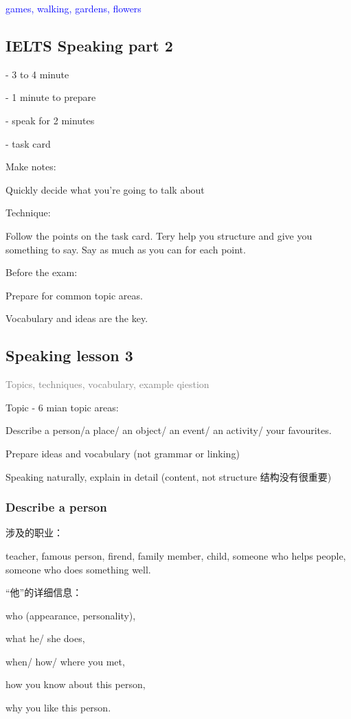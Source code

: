 \documentclass[12pt,a4paper]{article}
\newcommand{\textblue}[1]{\textcolor{blue}{#1}}  %
\begin{document}
\textblue{ games, walking, gardens, flowers}

\subsection*{IELTS Speaking part 2}

- 3 to 4 minute

- 1 minute to prepare

- speak for 2 minutes

- task card

Make notes:

Quickly decide what you're going to talk about

Technique:

Follow the points on the task card. Tery help you 
structure and give you something to say. Say as 
much as you can for each point.

Before the exam:

Prepare for common topic areas.

Vocabulary and ideas are the key.

\subsection*{Speaking lesson 3}

\textcolor{gray}{Topics, techniques, vocabulary, example qiestion}

Topic - 6 mian topic areas:

Describe a person/a place/ an object/ an event/ 
an activity/ your favourites. 

Prepare ideas and vocabulary (not grammar or linking)

Speaking naturally, explain in detail (content, not structure 结构没有很重要)

\subsubsection*{Describe a person}

涉及的职业：

teacher, famous person, firend, family member, 
child, someone who helps people, 
someone who does something well.

“他”的详细信息：

who (appearance, personality), \par
what he/ she does, \par
when/ how/ where you met, \par 
how you know about this person, \par
why you like this person. \par
\end{document}
